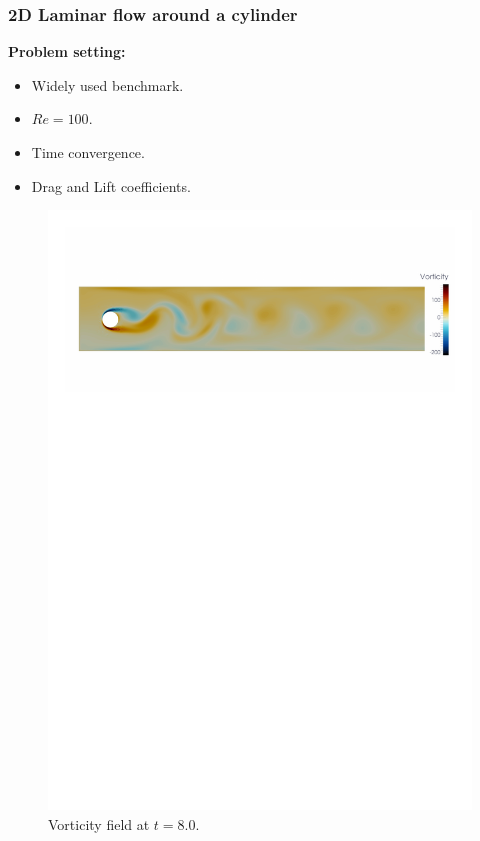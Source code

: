 \begin{frame}
  \frametitle{2D Laminar flow around a cylinder}
  \textbf{Problem setting:}
  \begin{itemize}
 	\item Widely used benchmark.
  	\item $Re=100$. 
  	\item Time convergence.
  	\item Drag and Lift coefficients.
  \end{itemize}
  \begin{figure}
   \centering	  
   \includegraphics[clip=true,trim=1.5cm 22.5cm 1cm 3cm,width=1.0\textwidth]{Figures/vorticity}
     \caption{Vorticity field at $t=8.0$.}
     \label{fig:Cyl_vorti}
  \end{figure}
\end{frame}
